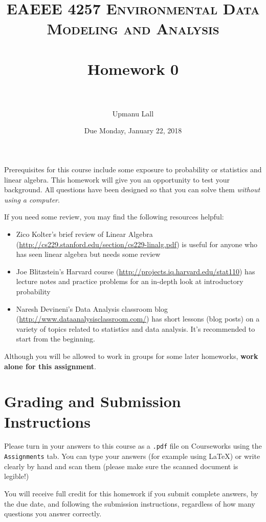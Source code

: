 \documentclass[paper=letter, fontsize=11pt]{scrartcl}
\title{
\normalfont \normalsize
\textsc{EAEEE 4257 Environmental Data Modeling and Analysis} \\ [25pt] %
\horrule{0.5pt} \\[0.4cm] %
\huge Homework 0 \\ %
\horrule{2pt} \\[0.5cm] %
}
\author{Upmanu Lall} %
\date{\normalsize Due Monday, January 22, 2018} %
\numberwithin{equation}{section}
\numberwithin{figure}{section}
\numberwithin{table}{section}
\begin{document}
\maketitle %


Prerequisites for this course include some exposure to probability or statistics and linear algebra.
This homework will give you an opportunity to test your background.
All questions have been designed so that you can solve them \emph{without using a computer}.

If you need some review, you may find the following resources helpful:
\begin{itemize}
  \item Zico Kolter's brief review of Linear Algebra (\url{http://cs229.stanford.edu/section/cs229-linalg.pdf}) is useful for anyone who has seen linear algebra but needs some review
  \item Joe Blitzstein's Harvard course (\url{http://projects.iq.harvard.edu/stat110}) has lecture notes and practice problems for an in-depth look at introductory probability
  \item Naresh Devineni's Data Analysis classroom blog (\url{http://www.dataanalysisclassroom.com/}) has short lessons (blog posts) on a variety of topics related to statistics and data analysis. It's recommended to start from the beginning.
\end{itemize}

Although you will be allowed to work in groups for some later homeworks, \textbf{work alone for this assignment}.

\section*{Grading and Submission Instructions}

Please turn in your answers to this course as a \texttt{.pdf} file on Courseworks using the \texttt{Assignments} tab.
You can type your answers (for example using \LaTeX) or write clearly by hand and scan them (please make sure the scanned document is legible!)

You will receive full credit for this homework if you submit complete answers, by the due date, and following the submission instructions, regardless of how many questions you answer correctly.
\end{document}
